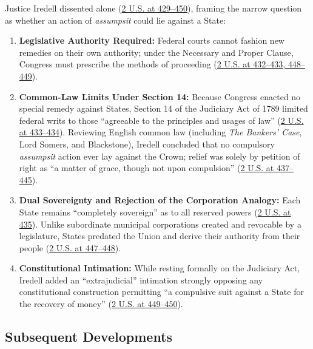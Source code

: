 \documentclass[12pt]{article}
\begin{document}
Justice Iredell dissented alone (\href{https://supreme.justia.com/cases/federal/us/2/419/}{2 U.S. at 429--450}), framing the narrow question as whether an action of \emph{assumpsit} could lie against a State:
\begin{enumerate}
  \item \textbf{Legislative Authority Required:} Federal courts cannot fashion new remedies on their own authority; under the Necessary and Proper Clause, Congress must prescribe the methods of proceeding (\href{https://supreme.justia.com/cases/federal/us/2/419/}{2 U.S. at 432--433, 448--449}).
  \item \textbf{Common-Law Limits Under Section 14:} Because Congress enacted no special remedy against States, Section 14 of the Judiciary Act of 1789 limited federal writs to those ``agreeable to the principles and usages of law'' (\href{https://supreme.justia.com/cases/federal/us/2/419/}{2 U.S. at 433--434}). Reviewing English common law (including \emph{The Bankers' Case}, Lord Somers, and Blackstone), Iredell concluded that no compulsory \emph{assumpsit} action ever lay against the Crown; relief was solely by petition of right as ``a matter of grace, though not upon compulsion'' (\href{https://supreme.justia.com/cases/federal/us/2/419/}{2 U.S. at 437--445}).
  \item \textbf{Dual Sovereignty and Rejection of the Corporation Analogy:} Each State remains ``completely sovereign'' as to all reserved powers (\href{https://supreme.justia.com/cases/federal/us/2/419/}{2 U.S. at 435}). Unlike subordinate municipal corporations created and revocable by a legislature, States predated the Union and derive their authority from their people (\href{https://supreme.justia.com/cases/federal/us/2/419/}{2 U.S. at 447--448}).
  \item \textbf{Constitutional Intimation:} While resting formally on the Judiciary Act, Iredell added an ``extrajudicial'' intimation strongly opposing any constitutional construction permitting ``a compulsive suit against a State for the recovery of money'' (\href{https://supreme.justia.com/cases/federal/us/2/419/}{2 U.S. at 449--450}).
\end{enumerate}

\subsection{Subsequent Developments}
\end{document}
